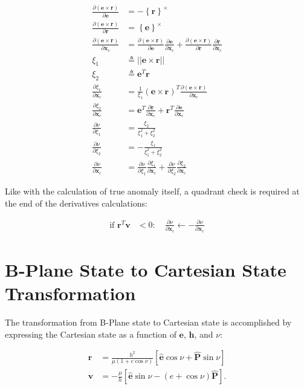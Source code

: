 \documentclass[]{article}
\newcommand{\vb}[1]{\bm{#1}} %
\newcommand{\vbh}[1]{\hat{\bm{#1}}} %
\newcommand{\pd}[2]{\frac{\partial #1}{\partial #2}} %
\newcommand{\xc}[0]{\vb{x}_c}
\begin{document}
\begin{align}
	\pd{\left( \vb{e} \times \vb{r} \right)}{\vb{e}} &= - \left\{ \vb{r} \right\}^{\times} \\
	\pd{\left( \vb{e} \times \vb{r} \right)}{\vb{r}} &= \left\{ \vb{e} \right\}^{\times} \\
	\pd{\left( \vb{e} \times \vb{r} \right)}{\xc} &= \pd{\left( \vb{e} \times \vb{r} \right)}{\vb{e}} \pd{\vb{e}}{\xc} + \pd{\left( \vb{e} \times \vb{r} \right)}{\vb{r}} \pd{\vb{r}}{\xc} \\
	\xi_1 &\triangleq || \vb{e} \times \vb{r} || \\
	\xi_2 &\triangleq \vb{e}^T \vb{r} \\ 
	\pd{\xi_1}{\xc} &= \frac{1}{\xi_1} \left( \vb{e} \times \vb{r} \right)^T \pd{\left( \vb{e} \times \vb{r} \right)}{\xc} \\
	\pd{\xi_2}{\xc} &= \vb{e}^T \pd{\vb{r}}{\xc} + \vb{r}^T \pd{\vb{e}}{\xc} \\
	\pd{\nu}{\xi_1} &= \frac{\xi_2}{\xi_1^2 + \xi_2^2} \\
	\pd{\nu}{\xi_2} &= - \frac{\xi_1}{\xi_1^2 + \xi_2^2} \\
	\pd{\nu}{\xc} &= \pd{\nu}{\xi_1} \pd{\xi_1}{\xc} + \pd{\nu}{\xi_2} \pd{\xi_2}{\xc}
\end{align}

Like with the calculation of true anomaly itself, a quadrant check is required at the end of the derivatives calculations:

\begin{align}
	\text{if } \vb{r}^T \vb{v} &< 0: \quad \pd{\nu}{\xc} \leftarrow - \pd{\nu}{\xc}
\end{align}

\section{B-Plane State to Cartesian State Transformation}
\label{sec:bplane2cartesian}

The transformation from B-Plane state to Cartesian state is accomplished by expressing the Cartesian state as a function of $\vb{e}$, $\vb{h}$, and $\nu$:

\begin{align}
	\vb{r} &= \frac{h^2}{\mu \left( 1 + e \cos{\nu} \right)} \left[ \vbh{e} \cos{\nu} + \vbh{P} \sin{\nu} \right] \\
	\vb{v} &= - \frac{\mu}{h} \left[ \vbh{e} \sin{\nu} - \left( e + \cos{\nu} \right) \vbh{P} \right].
\end{align}
\end{document}
